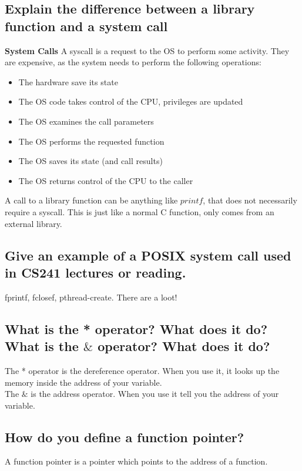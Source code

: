 \documentclass[a4paper]{article}
\begin{document}
\subsection{Explain the difference between a library function and a system call} %
\label{sub:Explain the ≠ between a library functino and a system call}
{\bf System Calls}
A syscall is a request to the OS to perform some activity. They are expensive, as the system needs to perform the following operations:
\begin{itemize}
  \item The hardware save its state
  \item The OS code takes control of the CPU, privileges are updated
  \item The OS examines the call parameters
  \item The OS performs the requested function
  \item The OS saves its state (and call results)
  \item The OS returns control of the CPU to the caller
\end{itemize}
A call to a library function can be anything like $printf$, that does not necessarily require a syscall. This is just like a
normal C function, only comes from an external library.
\subsection{Give an example of a POSIX system call used in CS241 lectures or reading.} %
\label{sub:Give an example of a POSIX system call used in CS241 lectures or reading.}
fprintf, fclosef, pthread-create. There are a loot!
\subsection{What is the * operator? What does it do? What is the $\&$ operator? What does it do?} %
\label{sub:subsection name}
The * operator is the dereference operator. When you use it, it looks up the memory inside the address of your variable. \\
The $\&$ is the address operator. When you use it tell you the address of your variable.
\subsection{How do you define a function pointer?} %
\label{sub:How do you define a function pointer?}
A function pointer is a pointer which points to the address of a function. 
\end{document}
